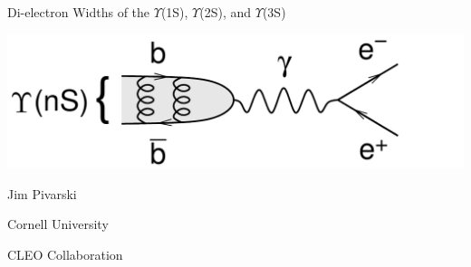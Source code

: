 \documentclass[landscape]{article}
\newenvironment{slide:nopage}[1][ ]{\mbox{\bf #1 } \vfill}{\vfill \mbox{ } \pagebreak}
\begin{document}
\huge \sffamily
\renewcommand{\labelitemi}{{\LARGE $\stackrel{\bullet}{\mbox{ }}$}}
\setlength{\parindent}{0 cm}

\begin{slide:nopage}
\begin{center}
\Huge
  Di-electron Widths of the $\Upsilon$(1S), $\Upsilon$(2S), and $\Upsilon$(3S)

  \vspace{1 cm}\includegraphics[width=0.5\linewidth]{diagram_GeeU}

  \vspace{2 cm} Jim Pivarski

  \vspace{1 cm} Cornell University

  \vspace{1 cm} CLEO Collaboration
\end{center}
\end{slide:nopage}

\addtocounter{page}{-1}
\end{document}
